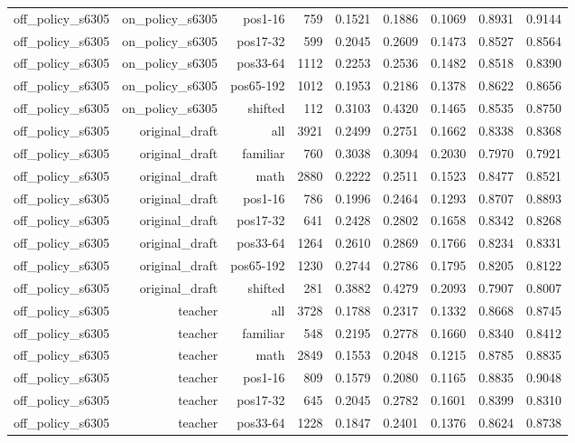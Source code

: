 \begin{tabular}{lrrrrrrrr}
off\_policy\_s6305 & on\_policy\_s6305 & pos1-16 & 759 & 0.1521 & 0.1886 & 0.1069 & 0.8931 & 0.9144 \\
off\_policy\_s6305 & on\_policy\_s6305 & pos17-32 & 599 & 0.2045 & 0.2609 & 0.1473 & 0.8527 & 0.8564 \\
off\_policy\_s6305 & on\_policy\_s6305 & pos33-64 & 1112 & 0.2253 & 0.2536 & 0.1482 & 0.8518 & 0.8390 \\
off\_policy\_s6305 & on\_policy\_s6305 & pos65-192 & 1012 & 0.1953 & 0.2186 & 0.1378 & 0.8622 & 0.8656 \\
off\_policy\_s6305 & on\_policy\_s6305 & shifted & 112 & 0.3103 & 0.4320 & 0.1465 & 0.8535 & 0.8750 \\
off\_policy\_s6305 & original\_draft & all & 3921 & 0.2499 & 0.2751 & 0.1662 & 0.8338 & 0.8368 \\
off\_policy\_s6305 & original\_draft & familiar & 760 & 0.3038 & 0.3094 & 0.2030 & 0.7970 & 0.7921 \\
off\_policy\_s6305 & original\_draft & math & 2880 & 0.2222 & 0.2511 & 0.1523 & 0.8477 & 0.8521 \\
off\_policy\_s6305 & original\_draft & pos1-16 & 786 & 0.1996 & 0.2464 & 0.1293 & 0.8707 & 0.8893 \\
off\_policy\_s6305 & original\_draft & pos17-32 & 641 & 0.2428 & 0.2802 & 0.1658 & 0.8342 & 0.8268 \\
off\_policy\_s6305 & original\_draft & pos33-64 & 1264 & 0.2610 & 0.2869 & 0.1766 & 0.8234 & 0.8331 \\
off\_policy\_s6305 & original\_draft & pos65-192 & 1230 & 0.2744 & 0.2786 & 0.1795 & 0.8205 & 0.8122 \\
off\_policy\_s6305 & original\_draft & shifted & 281 & 0.3882 & 0.4279 & 0.2093 & 0.7907 & 0.8007 \\
off\_policy\_s6305 & teacher & all & 3728 & 0.1788 & 0.2317 & 0.1332 & 0.8668 & 0.8745 \\
off\_policy\_s6305 & teacher & familiar & 548 & 0.2195 & 0.2778 & 0.1660 & 0.8340 & 0.8412 \\
off\_policy\_s6305 & teacher & math & 2849 & 0.1553 & 0.2048 & 0.1215 & 0.8785 & 0.8835 \\
off\_policy\_s6305 & teacher & pos1-16 & 809 & 0.1579 & 0.2080 & 0.1165 & 0.8835 & 0.9048 \\
off\_policy\_s6305 & teacher & pos17-32 & 645 & 0.2045 & 0.2782 & 0.1601 & 0.8399 & 0.8310 \\
off\_policy\_s6305 & teacher & pos33-64 & 1228 & 0.1847 & 0.2401 & 0.1376 & 0.8624 & 0.8738 \\

\end{tabular}
